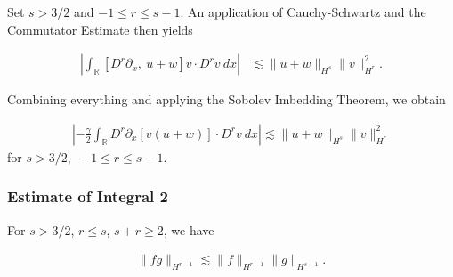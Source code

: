 \documentclass{beamer}
\numberwithin{equation}{section}
\newcommand{\rr}{\mathbb{R}}
\newcommand{\p}{\partial}
\begin{document}
\begin{frame}
Set $s > 3/2$ and $-1 \le r \le s -1$. An application of 
Cauchy-Schwartz and the Commutator Estimate then yields 


\begin{equation*}
\begin{split}
 \left | \int_{\rr} [D^r \p_x, \ u+w] v
\cdot D^r v \ dx \right |
& \lesssim \|u+w\|_{H^s} 
\|v\|_{H^r}^2.
\label{7v}
\end{split}
\end{equation*}


\pause

Combining everything and applying the Sobolev Imbedding 
Theorem, we obtain 


\begin{equation*}
\begin{split}
\left |  -\frac{\gamma}{2} \int_{\rr} D^r \p_x [v(u+w)] \cdot
D^r v \ dx \right |
 \lesssim \|u+w\|_{H^s} \|v\|_{H^r}^2
\label{8v}
\end{split}
\end{equation*}
for $s > 3/2, \ -1 \le r \le s-1$.
\end{frame}

\begin{frame}
\frametitle{Estimate of Integral 2} 







\begin{lemma}
For $s > 3/2$, $r \le s$, $s + r \ge 2$, we have


\begin{equation*}
\begin{split}
  \| fg \|_{H^{r-1}} \lesssim \| f \|_{H^{r-1}} \| g \|_{H^{s-1}}.
\end{split}
\end{equation*}


\label{lem:frac-deriv}
\end{lemma}


\end{frame}
\end{document}

